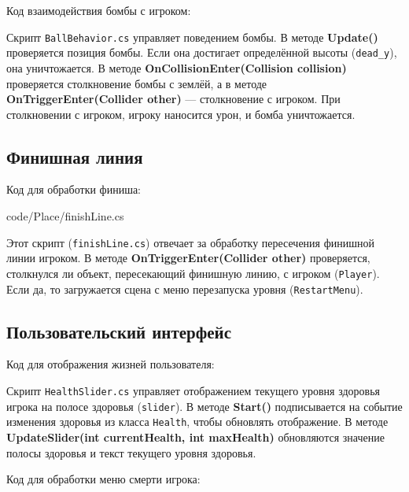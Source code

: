 Код взаимодействия бомбы с игроком:                                            


Скрипт \texttt{BallBehavior.cs} управляет поведением бомбы.
В методе \textbf{Update()} проверяется позиция бомбы.
Если она достигает определённой высоты (\texttt{dead\_y}), она уничтожается.
В методе \textbf{OnCollisionEnter(Collision collision)}
проверяется столкновение бомбы с землёй,
а в методе \textbf{OnTriggerEnter(Collider other)} --- столкновение с игроком.
При столкновении с игроком, игроку наносится урон, и бомба уничтожается.

\subsection{Финишная линия}

Код для обработки финиша:

{code/Place/finishLine.cs}

Этот скрипт (\texttt{finishLine.cs}) отвечает за обработку пересечения
финишной линии игроком. В методе \textbf{OnTriggerEnter(Collider other)}
проверяется, столкнулся ли объект, пересекающий финишную линию,
с игроком (\texttt{Player}).
Если да, то загружается сцена с меню перезапуска уровня (\texttt{RestartMenu}).

\subsection{Пользовательский интерфейс}                                           
                                                                               
Код для отображения жизней пользователя:                                       


Скрипт \texttt{HealthSlider.cs} управляет отображением текущего уровня
здоровья игрока на полосе здоровья (\texttt{slider}).
В методе \textbf{Start()} подписывается на событие изменения здоровья
из класса \texttt{Health}, чтобы обновлять отображение.
В методе \textbf{UpdateSlider(int currentHealth, int maxHealth)}
обновляются значение полосы здоровья и текст текущего уровня здоровья.

Код для обработки меню смерти игрока:                                          



